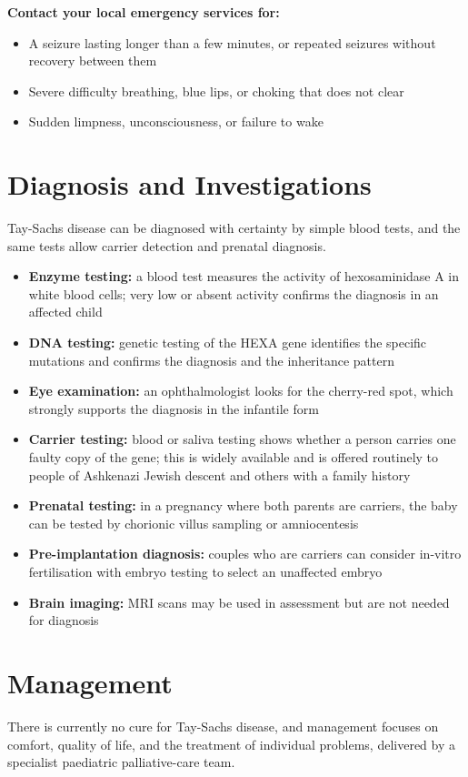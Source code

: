 \textbf{Contact your local emergency services for:}
\begin{itemize}
    \item A seizure lasting longer than a few minutes, or repeated seizures without recovery between them
    \item Severe difficulty breathing, blue lips, or choking that does not clear
    \item Sudden limpness, unconsciousness, or failure to wake
\end{itemize}

\section*{Diagnosis and Investigations}
Tay-Sachs disease can be diagnosed with certainty by simple blood tests, and the same tests allow carrier detection and prenatal diagnosis.

\begin{itemize}
    \item \textbf{Enzyme testing:} a blood test measures the activity of hexosaminidase A in white blood cells; very low or absent activity confirms the diagnosis in an affected child
    \item \textbf{DNA testing:} genetic testing of the HEXA gene identifies the specific mutations and confirms the diagnosis and the inheritance pattern
    \item \textbf{Eye examination:} an ophthalmologist looks for the cherry-red spot, which strongly supports the diagnosis in the infantile form
    \item \textbf{Carrier testing:} blood or saliva testing shows whether a person carries one faulty copy of the gene; this is widely available and is offered routinely to people of Ashkenazi Jewish descent and others with a family history
    \item \textbf{Prenatal testing:} in a pregnancy where both parents are carriers, the baby can be tested by chorionic villus sampling or amniocentesis
    \item \textbf{Pre-implantation diagnosis:} couples who are carriers can consider in-vitro fertilisation with embryo testing to select an unaffected embryo
    \item \textbf{Brain imaging:} MRI scans may be used in assessment but are not needed for diagnosis
\end{itemize}

\section*{Management}
There is currently no cure for Tay-Sachs disease, and management focuses on comfort, quality of life, and the treatment of individual problems, delivered by a specialist paediatric palliative-care team.

